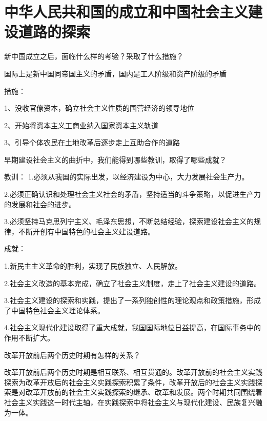 \documentclass[lang=cn,10pt]{elegantbook}
\begin{document}
	\chapter{中华人民共和国的成立和中国社会主义建设道路的探索}
	\begin{example}
		新中国成立之后，面临什么样的考验？采取了什么措施？
	\end{example}
	\begin{solution}
		
		国际上是新中国同帝国主义的矛盾，国内是工人阶级和资产阶级的矛盾
		
		措施：
		
		1、没收官僚资本，确立社会主义性质的国营经济的领导地位
		
		2、开始将资本主义工商业纳入国家资本主义轨道
		
		3、引导个体农民在土地改革后逐步走上互助合作的道路
	\end{solution}
	\begin{example}
		早期建设社会主义的曲折中，我们能得到哪些教训，取得了哪些成就？
	\end{example}
	\begin{solution}
		
		教训：
		1.必须从我国的实际出发，以经济建设为中心，大力发展社会生产力。
		
		2.必须正确认识和处理社会主义社会的矛盾，坚持适当的斗争策略，以促进生产力的发展和社会的进步。
		
		3.必须坚持马克思列宁主义、毛泽东思想，不断总结经验，探索建设社会主义的规律，不断开创有中国特色的社会主义建设道路。
		
		成就：
		
		1.新民主主义革命的胜利，实现了民族独立、人民解放。
		
		2.社会主义改造的基本完成，确立了社会主义制度，走上了社会主义建设的道路。
		
		3.社会主义建设的探索和实践，提出了一系列独创性的理论观点和政策措施，形成了中国特色社会主义理论体系。
		
		4.社会主义现代化建设取得了重大成就，我国国际地位日益提高，在国际事务中的作用不断扩大。
	\end{solution}
	\begin{example}
		改革开放前后两个历史时期有怎样的关系？
	\end{example}
	\begin{solution}
		 
		改革开放前后两个历史时期是相互联系、相互贯通的。改革开放前的社会主义实践探索为改革开放后的社会主义实践探索积累了条件，改革开放后的社会主义实践探索是对改革开放前的社会主义实践探索的继承、改革和发展。两个时期共同围绕着社会主义实践这一时代主轴，在实践探索中将社会主义与现代化建设、民族复兴融为一体。
	\end{solution}
\end{document}
